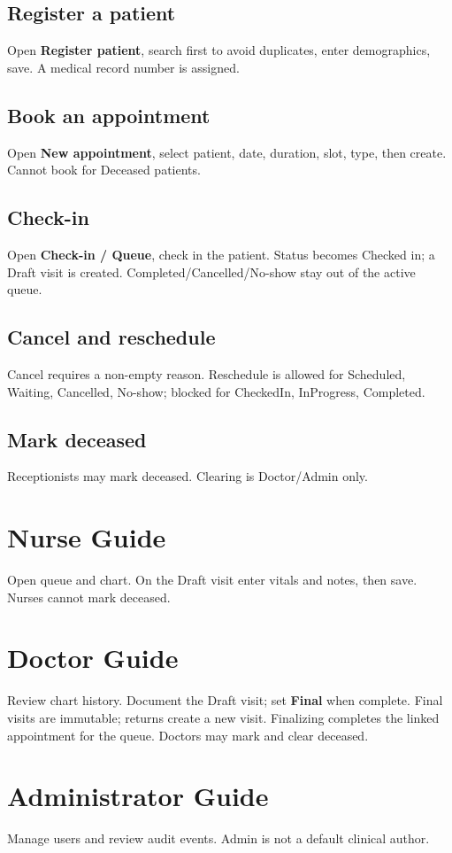 \documentclass[11pt,a4paper]{article}
\begin{document}
\subsection{Register a patient}
Open \textbf{Register patient}, search first to avoid duplicates, enter demographics, save. A medical record number is assigned.

\subsection{Book an appointment}
Open \textbf{New appointment}, select patient, date, duration, slot, type, then create. Cannot book for Deceased patients.

\subsection{Check-in}
Open \textbf{Check-in / Queue}, check in the patient. Status becomes Checked in; a Draft visit is created. Completed/Cancelled/No-show stay out of the active queue.

\subsection{Cancel and reschedule}
Cancel requires a non-empty reason. Reschedule is allowed for Scheduled, Waiting, Cancelled, No-show; blocked for CheckedIn, InProgress, Completed.

\subsection{Mark deceased}
Receptionists may mark deceased. Clearing is Doctor/Admin only.

\section{Nurse Guide}
Open queue and chart. On the Draft visit enter vitals and notes, then save. Nurses cannot mark deceased.

\section{Doctor Guide}
Review chart history. Document the Draft visit; set \textbf{Final} when complete. Final visits are immutable; returns create a new visit. Finalizing completes the linked appointment for the queue. Doctors may mark and clear deceased.

\section{Administrator Guide}
Manage users and review audit events. Admin is not a default clinical author.
\end{document}
